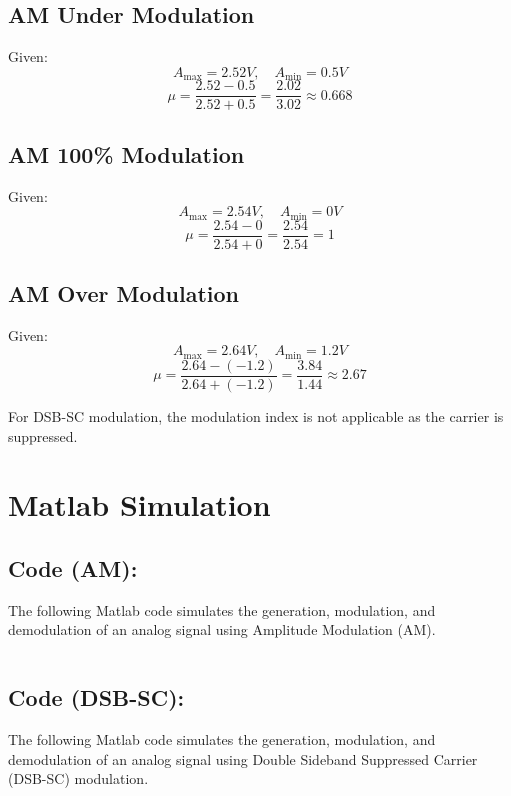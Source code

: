 \documentclass[12pt]{article}
\begin{document}
\subsection*{AM Under Modulation}
Given:
\[
    A_{\text{max}} = 2.52V, \quad A_{\text{min}} = 0.5V
\]
\[
    \mu = \frac{2.52 - 0.5}{2.52 + 0.5} = \frac{2.02}{3.02} \approx 0.668
\]

\subsection*{AM 100\% Modulation}
Given:
\[
    A_{\text{max}} = 2.54V, \quad A_{\text{min}} = 0V
\]
\[
    \mu = \frac{2.54 - 0}{2.54 + 0} = \frac{2.54}{2.54} = 1
\]

\subsection*{AM Over Modulation}
Given:
\[
    A_{\text{max}} = 2.64V, \quad A_{\text{min}} = 1.2V
\]
\[
    \mu = \frac{2.64 - (-1.2)}{2.64 + (-1.2)} = \frac{3.84}{1.44} \approx 2.67
\]

For DSB-SC modulation, the modulation index is not applicable as the carrier is suppressed.

\section*{Matlab Simulation}

\subsection*{Code (AM):}
The following Matlab code simulates the generation, modulation, and demodulation of an analog signal using Amplitude Modulation (AM).

\inputminted[linenos,breaklines,breakanywhere]{matlab}{./assets/am.m}

\subsection*{Code (DSB-SC):}
The following Matlab code simulates the generation, modulation, and demodulation of an analog signal using Double Sideband Suppressed Carrier (DSB-SC) modulation.

\inputminted[linenos,breaklines,breakanywhere]{matlab}{./assets/dsb-sc.m}
\end{document}
